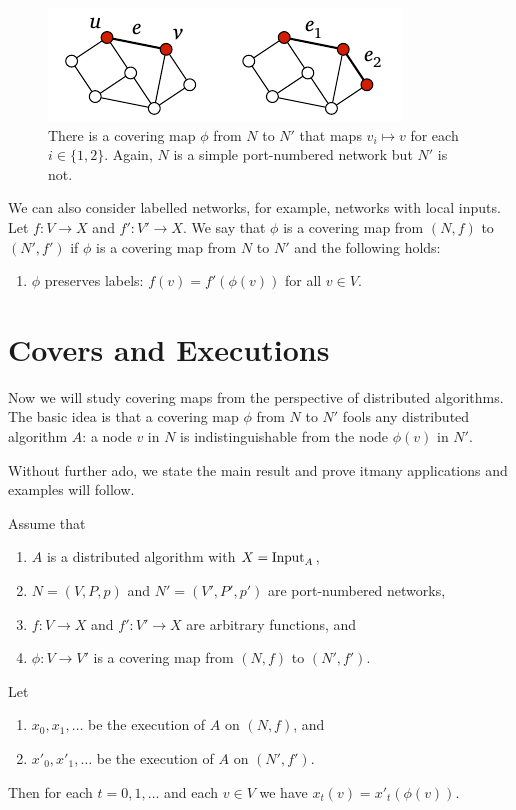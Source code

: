 \begin{figure}
    \centering
    \includegraphics[page=\PCoveringMapC]{figs.pdf}
    \caption{There is a covering map $\phi$ from $N$ to $N'$ that maps $v_i \mapsto v$ for each $i \in \{1, 2\}$. Again, $N$ is a simple port-numbered network but $N'$ is not.}\label{fig:covering-map3}
\end{figure}

We can also consider labelled networks, for example, networks with local inputs. Let $f\colon V \to X$ and $f'\colon V' \to X$. We say that $\phi$ is a covering map from $(N,f)$ to $(N'\!,f')$ if $\phi$ is a covering map from $N$ to $N'$ and the following holds:
\begin{enumerate}[resume*]
    \item $\phi$ preserves labels: $f(v) = f'(\phi(v))$ for all $v \in V$.
\end{enumerate}

\section{Covers and Executions}

Now we will study covering maps from the perspective of distributed algorithms. The basic idea is that a covering map $\phi$ from $N$ to $N'$ fools any distributed algorithm $A$: a node $v$ in $N$ is indistinguishable from the node $\phi(v)$ in $N'$.

Without further ado, we state the main result and prove it\mydash many applications and examples will follow.

\begin{theorem}\label{thm:cover}
    Assume that
    \begin{enumerate}[itemsep=0ex]\raggedright
        \item $A$ is a distributed algorithm with $X = \operatorname{Input}_A$,
        \item $N = (V,P,p)$ and $N' = (V'\!,P'\!,p')$ are port-numbered networks,
        \item $f\colon V \to X$ and $f'\colon V' \to X$ are arbitrary functions, and
        \item $\phi\colon V \to V'$ is a covering map from $(N,f)$ to $(N'\!,f')$.
    \end{enumerate}
    Let
    \begin{enumerate}[resume*]
        \item $x_0, x_1, \dotsc$ be the execution of $A$ on $(N,f)$, and
        \item $x'_0, x'_1, \dotsc$ be the execution of $A$ on $(N'\!,f')$.
    \end{enumerate}
    Then for each $t = 0, 1, \dotsc$ and each $v \in V$ we have $x_t(v) = x'_t(\phi(v))$.
\end{theorem}

